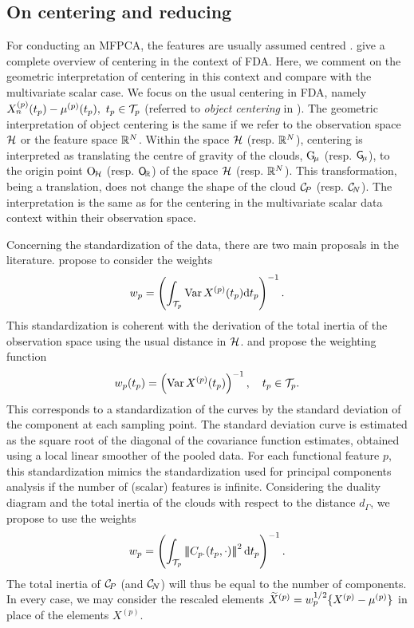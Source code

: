 \subsection{On centering and reducing} %
\label{sub:on_centering_and_reducing}

For conducting an MFPCA, the features are usually assumed centred \citep{happMultivariateFunctionalPrincipal2018a}. \cite{protheroNewPerspectivesCentering2023} give a complete overview of centering in the context of FDA. Here, we comment on the geometric interpretation of centering in this context and compare with the multivariate scalar case. We focus on the usual centering in FDA, namely $X_n^{(p)}(t_p) - \mu^{(p)}(t_p),~t_p \in \mathcal{T}_{p}$ (referred to \emph{object centering} in \cite{protheroNewPerspectivesCentering2023}).
The geometric interpretation of object centering is the same if we refer to the observation space $\mathcal{H}$ or the feature space $\mathbb{R}^N$. Within the space $\mathcal{H}$ (resp. $\mathbb{R}^N$), centering is interpreted as translating the centre of gravity of the clouds, $\mathrm{G}_{\!\mu}$ (resp. $\mathsf{G}_{\!\mu}$), to the origin point $\mathrm{O}_{\!\mathcal{H}}$ (resp. $\mathsf{O}_{\!\mathbb{R}}$) of the space $\mathcal{H}$ (resp. $\mathbb{R}^N$). This transformation, being a translation, does not change the shape of the cloud $\mathcal{C}_{\!P}$ (resp. $\mathcal{C}_{\!N}$). The interpretation is the same as for the centering in the multivariate scalar data context within their observation space.

Concerning the standardization of the data, there are two main proposals in the literature. \cite{happMultivariateFunctionalPrincipal2018a} propose to consider the weights
\begin{equation}
w_p = \left(\int_{\mathcal{T}_{p}} \operatorname{Var} X^{(p)}(t_p) {\rm d} t_p\right)^{-1}.
\end{equation}
This standardization is coherent with the derivation of the total inertia of the observation space using the usual distance in $\mathcal{H}$. \cite{chiouMultivariateFunctionalPrincipal2014} and \cite{jacquesModelbasedClusteringMultivariate2014a} propose the weighting function
\begin{equation}
w_p(t_p) = \left(\operatorname{Var} X^{(p)}(t_p)\right)^{-1}, \quad t_p \in \mathcal{T}_{p}.
\end{equation}
This corresponds to a standardization of the curves by the standard deviation of the component at each sampling point. The standard deviation curve is estimated as the square root of the diagonal of the covariance function estimates, obtained using a local linear smoother of the pooled data. For each functional feature $p$, this standardization mimics the standardization used for principal components analysis if the number of (scalar) features is infinite.
Considering the duality diagram and the total inertia of the clouds with respect to the distance $d_\Gamma$, we propose to use the weights
\begin{equation}
    w_p = \left(\int_{\mathcal{T}_{p}} \left|\!\left|\!\left|C_{p \cdot}(t_p, \cdot)\right|\!\right|\!\right|^2 {\rm d} t_p\right)^{-1}.
\end{equation}
The total inertia of $\mathcal{C}_{\!P}$ (and $\mathcal{C}_{\!N}$) will thus be equal to the number of components.
In every case, we may consider the rescaled elements $\widetilde{X}^{(p)} = w_p^{1/2}\{X^{(p)} - \mu^{(p)}\}$ in place of the elements $X^{(p)}$.


